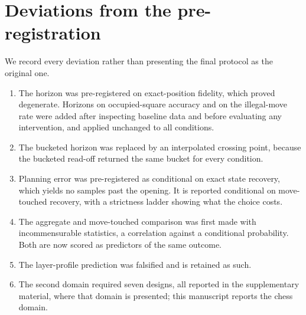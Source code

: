 \documentclass[11pt]{article}
\theoremstyle{remark}
\begin{document}
\section{Deviations from the pre-registration}
\label{app:deviations}

We record every deviation rather than presenting the final protocol as the
original one.

\begin{enumerate}[nosep]
\item The horizon was pre-registered on exact-position fidelity, which proved
degenerate. Horizons on occupied-square accuracy and on the illegal-move rate
were added after inspecting baseline data and before evaluating any intervention,
and applied unchanged to all conditions.
\item The bucketed horizon was replaced by an interpolated crossing point,
because the bucketed read-off returned the same bucket for every condition.
\item Planning error was pre-registered as conditional on exact state recovery,
which yields no samples past the opening. It is reported conditional on
move-touched recovery, with a strictness ladder showing what the choice costs.
\item The aggregate and move-touched comparison was first made with
incommensurable statistics, a correlation against a conditional probability. Both
are now scored as predictors of the same outcome.
\item The layer-profile prediction was falsified and is retained as such.
\item The second domain required seven designs, all reported in the supplementary
material, where that domain is presented; this manuscript reports the chess
domain.
\end{enumerate}



\end{document}
